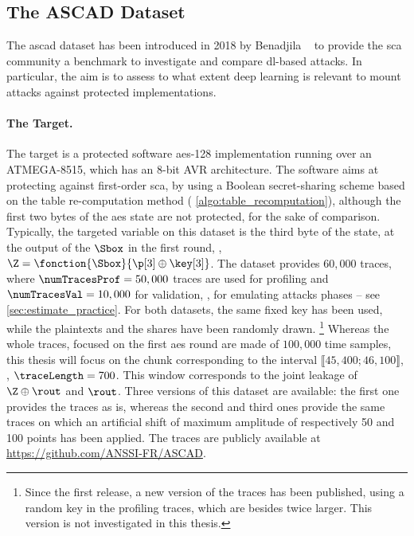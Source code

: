 \subsection{The ASCAD Dataset}
\label{sec:ascad}
The \gls{ascad} dataset has been introduced in 2018 by Benadjila \etal{}~\cite{prouff_study_2018} to provide the \gls{sca} community a benchmark to investigate and compare \gls{dl}-based attacks.
In particular, the aim is to assess to what extent deep learning is relevant to mount attacks against protected implementations.

\paragraph{The Target.}
The target is a protected software \gls{aes}-128 implementation running over an \textsf{ATMEGA-8515}, which has an 8-bit \textsf{AVR} architecture.
The software aims at protecting against first-order \gls{sca}, by using a Boolean secret-sharing scheme based on the table re-computation method (\cf{} \autoref{algo:table_recomputation}), although the first two bytes of the \gls{aes} state are not protected, for the sake of comparison.
Typically, the targeted variable on this dataset is the third byte of the state, at the output of the \(\Sbox\) in the first round, \ie{}, \(\Z = \fonction{\Sbox}{\p[3] \oplus \key[3]}\).
The dataset provides \(60, 000\) traces, where \(\numTracesProf = 50, 000\) traces are used for profiling and \(\numTracesVal = 10, 000\) for validation, \ie{}, for emulating attacks phases -- see \autoref{sec:estimate_practice}.
For both datasets, the same fixed key has been used, while the plaintexts and the shares have been randomly drawn.%
\footnote{
    Since the first release, a new version of the traces has been published, using a random key in the profiling traces, which are besides twice larger.
    This version is not investigated in this thesis.
}
Whereas the whole traces, focused on the first \gls{aes} round are made of \(100,000\) time samples, this thesis will focus on the chunk corresponding to the interval \(\llbracket 45,400; 46,100\rrbracket\), \ie{}, \(\traceLength = 700\).
This window corresponds to the joint leakage of \(\Z \oplus \rout\) and \(\rout\).
Three versions of this dataset are available: the first one provides the traces as is, whereas the second and third ones provide the same traces on which an artificial shift of maximum amplitude of respectively 50 and 100 points has been applied.
The traces are publicly available at \url{https://github.com/ANSSI-FR/ASCAD}.

